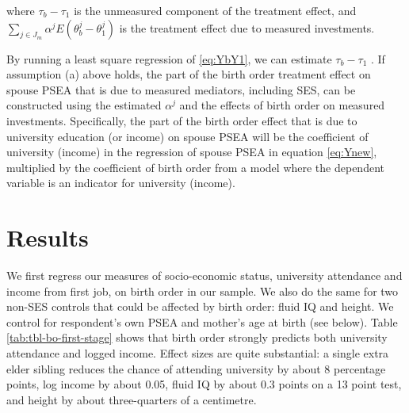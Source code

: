 \documentclass[
]{article}
\begin{document}
where \(\tau_b - \tau_1\) is the unmeasured component of the treatment
effect, and \(\sum_{j \in J_m} \alpha^j E(\theta^j_b - \theta^j_1)\) is
the treatment effect due to measured investments.

By running a least square regression of \eqref{eq:YbY1}, we can estimate
\(\tau_b - \tau_1\) . If assumption (a) above holds, the part of the birth
order treatment effect on spouse PSEA that is due to measured mediators,
including SES, can be constructed using the estimated \(\alpha^j\) and the
effects of birth order on measured investments. Specifically, the part
of the birth order effect that is due to university education (or
income) on spouse PSEA will be the coefficient of university (income) in
the regression of spouse PSEA in equation \eqref{eq:Ynew}, multiplied by
the coefficient of birth order from a model where the dependent variable
is an indicator for university (income).

\hypertarget{results}{%
\section{Results}\label{results}}

We first regress our measures of socio-economic status, university
attendance and income from first job, on birth order in our sample. We
also do the same for two non-SES controls that could be affected by
birth order: fluid IQ and height. We control for respondent's own PSEA
and mother's age at birth (see below). Table
\ref{tab:tbl-bo-first-stage} shows that birth order strongly predicts
both university attendance and logged income. Effect sizes are quite
substantial: a single extra elder sibling reduces the chance of
attending university by about 8 percentage points, log income by about
0.05, fluid IQ by about 0.3 points on a 13 point test, and height by
about three-quarters of a centimetre.

 
  \providecommand{\huxb}[2]{\arrayrulecolor[RGB]{#1}\global\arrayrulewidth=#2pt}
  \providecommand{\huxvb}[2]{\color[RGB]{#1}\vrule width #2pt}
  \providecommand{\huxtpad}[1]{\rule{0pt}{#1}}
  \providecommand{\huxbpad}[1]{\rule[-#1]{0pt}{#1}}
\end{document}
